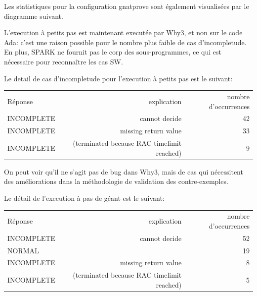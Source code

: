 \documentclass[a4paper,11pt]{article}
\begin{document}
Les statistiques pour la configuration gnatprove sont également visualisées par
le diagramme suivant.
\begin{center}
\end{center}

L'execution à petits pas est maintenant executée par Why3, et non sur le code
Ada: c'est une raison possible pour le nombre plus faible de cas d'incompletude.
En plus, SPARK ne fournit pas le corp des sous-programmes, ce qui est nécessaire
pour reconnaître les cas SW.

Le detail de cas d'incompletude pour l'execution à petits pas est le suivant:

\begin{center}
  \begin{tabular}{|l|r|r|}
    \hline
  \rowcolor{gray!50} Réponse
  & \multicolumn{1}{p{0.65\textwidth}|}{explication}
  & \multicolumn{1}{p{0.13\textwidth}|}{nombre d'occurrences}
    \\
INCOMPLETE & cannot decide & 42 \\
INCOMPLETE & missing return value & 33 \\
INCOMPLETE & (terminated because RAC timelimit reached) & 9 \\
    \hline
  \end{tabular}
\end{center}

On peut voir qu'il ne s'agit pas de bug dans Why3, mais de cas qui nécessitent
des améliorations dans la méthodologie de validation des contre-exemples.

Le détail de l'execution à pas de géant est le suivant:

\begin{center}
  \begin{tabular}{|l|r|r|}
    \hline
  \rowcolor{gray!50} Réponse
  & \multicolumn{1}{p{0.65\textwidth}|}{explication}
  & \multicolumn{1}{p{0.13\textwidth}|}{nombre d'occurrences}
    \\
INCOMPLETE & cannot decide & 52 \\
NORMAL & & 19 \\
INCOMPLETE & missing return value & 8 \\
INCOMPLETE & (terminated because RAC timelimit reached) & 5 \\
    \hline
  \end{tabular}
\end{center}
\end{document}
